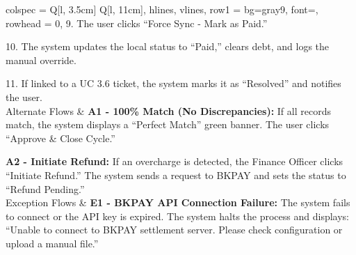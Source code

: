 \begin{longtblr}[
  caption = {UC 3.7: Reconcile Financial Data},
]{
  colspec = {Q[l, 3.5cm] Q[l, 11cm]}, 
  hlines, vlines,
  row{1} = {bg=gray9, font=\bfseries}, 
  rowhead = 0, 
}
9. The user clicks ``Force Sync - Mark as Paid.'' \par
10. The system updates the local status to ``Paid,'' clears debt, and logs the manual override. \par
11. If linked to a UC 3.6 ticket, the system marks it as ``Resolved'' and notifies the user. \\
Alternate Flows & 
\textbf{A1 - 100\% Match (No Discrepancies):} If all records match, the system displays a ``Perfect Match'' green banner. The user clicks ``Approve \& Close Cycle.'' \par \vspace{0.5em}
\textbf{A2 - Initiate Refund:} If an overcharge is detected, the Finance Officer clicks ``Initiate Refund.'' The system sends a request to BKPAY and sets the status to ``Refund Pending.'' \\
Exception Flows & 
\textbf{E1 - BKPAY API Connection Failure:} The system fails to connect or the API key is expired. The system halts the process and displays: ``Unable to connect to BKPAY settlement server. Please check configuration or upload a manual file.'' \par \vspace{0.5em}
\end{longtblr}